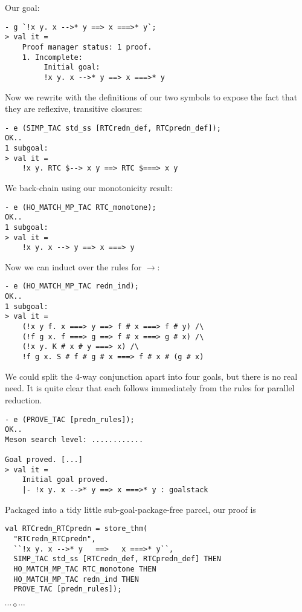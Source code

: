 \documentclass[12pt]{article}
\newcommand{\eos}{\hfill{}$\cdots\diamond\cdots$\hfill{}\vspace{5mm}}
\begin{document}
Our goal:
\begin{session}\begin{verbatim}
- g `!x y. x -->* y ==> x ===>* y`;
> val it =
    Proof manager status: 1 proof.
    1. Incomplete:
         Initial goal:
         !x y. x -->* y ==> x ===>* y
\end{verbatim}\end{session}
Now we rewrite with the definitions of our two symbols to expose the
fact that they are reflexive, transitive closures:
\begin{session}\begin{verbatim}
- e (SIMP_TAC std_ss [RTCredn_def, RTCpredn_def]);
OK..
1 subgoal:
> val it =
    !x y. RTC $--> x y ==> RTC $===> x y
\end{verbatim}\end{session}
We back-chain using our monotonicity result:
\begin{session}\begin{verbatim}
- e (HO_MATCH_MP_TAC RTC_monotone);
OK..
1 subgoal:
> val it =
    !x y. x --> y ==> x ===> y
\end{verbatim}\end{session}
Now we can induct over the rules for $\rightarrow$:
\begin{session}\begin{verbatim}
- e (HO_MATCH_MP_TAC redn_ind);
OK..
1 subgoal:
> val it =
    (!x y f. x ===> y ==> f # x ===> f # y) /\
    (!f g x. f ===> g ==> f # x ===> g # x) /\
    (!x y. K # x # y ===> x) /\
    !f g x. S # f # g # x ===> f # x # (g # x)
\end{verbatim}\end{session}
We could split the 4-way conjunction apart into four goals, but there
is no real need.  It is quite clear that each follows immediately from
the rules for parallel reduction.
\begin{session}\begin{verbatim}
- e (PROVE_TAC [predn_rules]);
OK..
Meson search level: ............

Goal proved. [...]
> val it =
    Initial goal proved.
    |- !x y. x -->* y ==> x ===>* y : goalstack
\end{verbatim}\end{session}
Packaged into a tidy little sub-goal-package-free parcel, our proof is
\begin{session}\begin{verbatim}
val RTCredn_RTCpredn = store_thm(
  "RTCredn_RTCpredn",
  ``!x y. x -->* y   ==>   x ===>* y``,
  SIMP_TAC std_ss [RTCredn_def, RTCpredn_def] THEN
  HO_MATCH_MP_TAC RTC_monotone THEN
  HO_MATCH_MP_TAC redn_ind THEN
  PROVE_TAC [predn_rules]);
\end{verbatim}\end{session}
\eos{}
\end{document}

